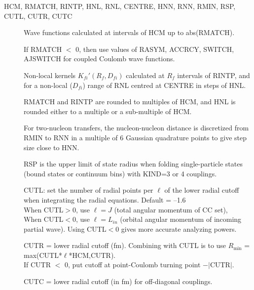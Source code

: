 \documentclass[11pt]{article}
\begin{document}
\begin{description}
\item[HCM,  RMATCH, RINTP, HNL, RNL, CENTRE, HNN, RNN, RMIN, RSP, CUTL, CUTR, CUTC] \hfill


Wave functions calculated at intervals of HCM up to abs(RMATCH).

If RMATCH $<$ 0, then use values of RASYM, ACCRCY, SWITCH, AJSWITCH for  coupled Coulomb wave functions.

Non-local kernels $K_{fi}'(R_{f},D_{fi})$ calculated at $R_f$ intervals of RINTP,
and for a non-local ($D_{fi}$) range of RNL centred at CENTRE in steps of HNL.

RMATCH and RINTP are rounded to multiples of HCM, and HNL is rounded either to
a multiple or a sub-multiple of HCM.

For two-nucleon transfers, the nucleon-nucleon distance is
discretized from RMIN to RNN in a multiple of 6 Gaussian quadrature
points to give step size close to HNN.

RSP is the upper limit of state radius when folding single-particle states (bound states or continuum bins) with
KIND=3 or 4 couplings.


CUTL: set the number of radial points per $\ell$ of the lower radial cutoff when integrating the radial equations. Default = --1.6\\
When CUTL$>$0, use $\ell=J$ (total angular momentum of CC set),\\
When CUTL$<$0, use $\ell=L_{in}$ (orbital angular momentum of incoming partial wave). 
Using  CUTL$<$0 gives more accurate analyzing powers.

CUTR = lower radial cutoff (fm).  Combining with CUTL is to use $R_{\min}$ = max(CUTL*$\ell$*HCM,CUTR).\\
If CUTR $<$ 0, put cutoff at point-Coulomb turning point $- |$CUTR$|$.

CUTC = lower radial cutoff (in fm) for off-diagonal couplings.

\end{description}
\end{document}

